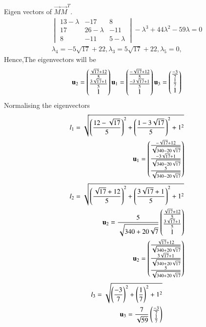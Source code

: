 \documentclass[journal,12pt,twocolumn]{IEEEtran}
\begin{document}
Eigen vectors of $\vec{M}$$\vec{M}^T.$
\begin{align}
\begin{vmatrix}
13-\lambda&-17&8\\17&26-\lambda&-11\\8&-11&5-\lambda
\end{vmatrix}
-\lambda^3+44\lambda^2-59\lambda=0\\
\lambda_4=-5\sqrt{17}+22,\lambda_3=5\sqrt{17}+22,\lambda_5=0,
\end{align}
Hence,The eigenvectors will be
\begin{align}
\mathbf{u}_2=\begin{pmatrix}\frac{\sqrt{17}+12}{5}\\\frac{3\sqrt{17}+1}{5}\\1\end{pmatrix}
\mathbf{u}_1=\begin{pmatrix}\frac{-\sqrt{17}+12}{5}\\\frac{-3\sqrt{17}+1}{5}\\1\end{pmatrix}
\mathbf{u}_3=\begin{pmatrix}\frac{-3}{7}\\\frac{1}{7}\\1\end{pmatrix}
\end{align}
Normalising the eigenvectors
\begin{align}
l_1=\sqrt{{\left(\frac{12-\sqrt{17}}{5}\right)}^2+{\left(\frac{1-3\sqrt{17}}{5}\right)}^2+1^2}\\
\mathbf{u}_1=\begin{pmatrix}\frac{-\sqrt{17}+12}{\sqrt{340-20\sqrt{17}}}\\\frac{-3\sqrt{17}+1}{\sqrt{340-20\sqrt{17}}}\\\frac{5}{\sqrt{340-20\sqrt{17}}}\end{pmatrix}\\
\end{align}
\begin{align}
l_2=\sqrt{\left({\frac{\sqrt{17}+12}{5}}\right)^2+\left({\frac{3\sqrt{17}+1}{5}}\right)^2+1^2}\\
\mathbf{u}_2=\frac{5}{\sqrt{340+20\sqrt{7}}}\begin{pmatrix}\frac{\sqrt{17}+12}{5}\\\frac{3\sqrt{17}+1}{5}\\1\end{pmatrix}\\
\mathbf{u}_2=\begin{pmatrix}\frac{\sqrt{17}+12}{\sqrt{340+20\sqrt{17}}}\\\frac{3\sqrt{17}+1}{\sqrt{340+20\sqrt{17}}}\\\frac{5}{\sqrt{340+20\sqrt{17}}}\end{pmatrix}
\end{align}
\begin{align}
l_3=\sqrt{\left({\frac{-3}{7}}\right)^2+\left({\frac{1}{7}}\right)^2+1^2}\\
\vec{u}_3=\frac{7}{\sqrt{59}}\myvec{\frac{-3}{7}\\\frac{1}{7}}\\

\end{align}$$
\end{document}
